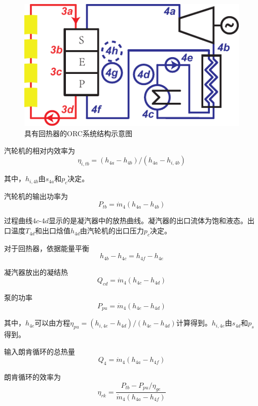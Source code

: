 \noindent \begin{figure}[htbp]
\begin{center}
	\includegraphics[width = 0.4\columnwidth]{fig/ORCsystem2.pdf}
	\caption{具有回热器的ORC系统结构示意图}
	\label{fig:ORCsystem2}
\end{center}
\end{figure}

汽轮机的相对内效率为
\begin{equation}
  \eta_{i,tb} = (h_{4a}-h_{4b})/(h_{4a}-h_{i,4b})
\end{equation}

其中，$h_{i,4b}$由$s_{4a}$和$p_c$决定。

汽轮机的输出功率为
\begin{equation}
  P_{tb}=\dot{m}_{4}(h_{4a}-h_{4b})
\end{equation}

过程曲线$4c$-$4d$显示的是凝汽器中的放热曲线。凝汽器的出口流体为饱和液态。出口温度$T_{4d}$和出口焓值$h_{4d}$由汽轮机的出口压力$p_c$决定。

对于回热器，依据能量平衡
\begin{equation}
  h_{4b} - h_{4c} = h_{4f} - h_{4e}
\end{equation}

凝汽器放出的凝结热
\begin{equation}
  Q_{cd} = \dot{m}_4 (h_{4c} - h_{4d})
\end{equation}

泵的功率
\begin{equation}
P_{pu}=\dot{m}_{4}(h_{4e}-h_{4d})
\end{equation}
    
其中，$h_{4e}$可以由方程$\eta_{pu} = (h_{i,4e}-h_{4d})/(h_{4e}-h_{4d})$计算得到。$h_{i,4e}$由$s_{4d}$和$p_s$得到。
    
输入朗肯循环的总热量
\begin{equation}
    Q_4=\dot{m}_4(h_{4a}-h_{4f})
\end{equation}

朗肯循环的效率为
\begin{equation}
	\eta_{rk}=\dfrac{P_{tb}-P_{pu}/\eta_{ge}}{\dot{m}_4(h_{4a}-h_{4f})}
\end{equation}

